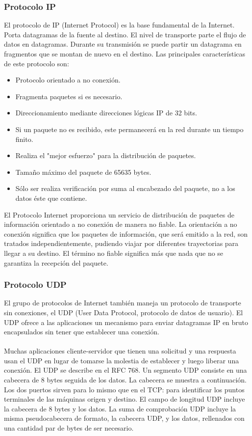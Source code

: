 \documentclass[12pt,letterpaper]{article}
\begin{document}
\subsubsection{Protocolo IP}
El protocolo de IP (Internet Protocol) es la base fundamental de la Internet. Porta 
datagramas de la fuente al destino. El nivel de transporte parte el flujo de datos en 
datagramas. Durante su transmisión se puede partir un datagrama en fragmentos que se 
montan de nuevo en el destino. Las principales características de este protocolo son:
\begin{itemize}
    \item Protocolo orientado a no conexión.
    \item Fragmenta paquetes si es necesario.
    \item Direccionamiento mediante direcciones lógicas IP de 32 bits.
    \item Si un paquete no es recibido, este permanecerá en la red durante un tiempo finito.
    \item Realiza el "mejor esfuerzo" para la distribución de paquetes.
    \item Tamaño máximo del paquete de 65635 bytes.
    \item Sólo ser realiza verificación por suma al encabezado del paquete, no a los datos éste que contiene.
\end{itemize}

El Protocolo Internet proporciona un servicio de distribución de paquetes de información 
orientado a no conexión de manera no fiable. La orientación a no conexión significa que los 
paquetes de información, que será emitido a la red, son tratados independientemente, pudiendo 
viajar por diferentes trayectorias para llegar a su destino. El término no fiable significa 
más que nada que no se garantiza la recepción del paquete. \cite{ip}

\subsubsection{Protocolo UDP}
El grupo de protocolos de Internet también maneja un protocolo de transporte sin conexiones, 
el UDP (User Data Protocol, protocolo de datos de usuario). El UDP ofrece a las aplicaciones 
un mecanismo para enviar datagramas IP en bruto encapsulados sin tener que establecer una 
conexión.
\\ \\
Muchas aplicaciones cliente-servidor que tienen una solicitud y una respuesta usan el UDP en 
lugar de tomarse la molestia de establecer y luego liberar una conexión. El UDP se describe 
en el RFC 768. Un segmento UDP consiste en una cabecera de 8 bytes seguida de los datos. La 
cabecera se muestra a continuación. Los dos puertos sirven para lo mismo que en el TCP: para 
identificar los puntos terminales de las máquinas origen y destino. El campo de longitud UDP 
incluye la cabecera de 8 bytes y los datos. La suma de comprobación UDP incluye la misma 
pseudocabecera de formato, la cabecera UDP, y los datos, rellenados con una cantidad par 
de bytes de ser necesario. \cite{udp}
\end{document}
